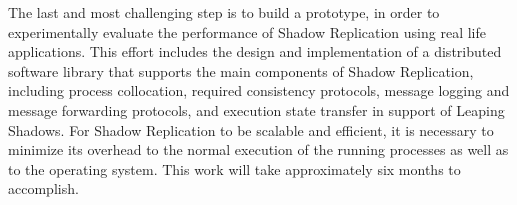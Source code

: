 The last and most challenging step is to build a prototype, in order to experimentally evaluate the performance of Shadow Replication using real life applications. This effort includes the design and implementation of a distributed software library that supports the main components of Shadow Replication, including process collocation, required consistency protocols, message logging and message forwarding protocols, and execution state transfer in support of Leaping Shadows. For Shadow Replication to be scalable and efficient, it is necessary to minimize its overhead to the normal execution of the running processes as well as to the operating system. This work will take approximately six months to accomplish. 




